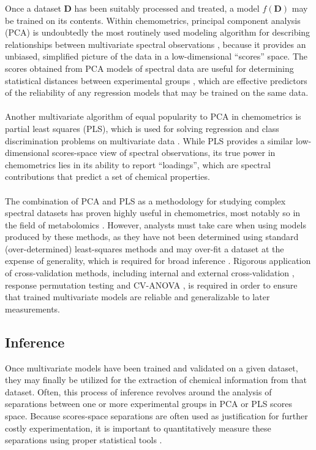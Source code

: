 \begin{doublespace}
Once a dataset $\mathbf{D}$ has been suitably processed and treated, a model
$f(\mathbf{D})$ may be trained on its contents. Within chemometrics, principal
component analysis (PCA) is undoubtedly the most routinely used modeling
algorithm for describing relationships between multivariate spectral
observations \cite{bro:anmeth2014}, because it provides an unbiased,
simplified picture of the data in a low-dimensional ``scores'' space. The
scores obtained from PCA models of spectral data are useful for determining
statistical distances between experimental groups
\cite{demaesschalck:cils2000,worley:abio2013}, which are effective predictors
of the reliability of any regression models that may be trained on the same
data.
\\\\
Another multivariate algorithm of equal popularity to PCA in chemometrics is
partial least squares (PLS), which is used for solving regression and class
discrimination problems on multivariate data \cite{wold1993}. While PLS
provides a similar low-dimensional scores-space view of spectral observations,
its true power in chemometrics lies in its ability to report ``loadings'',
which are spectral contributions that predict a set of chemical properties.
\\\\
The combination of PCA and PLS as a methodology for studying complex spectral
datasets has proven highly useful in chemometrics, most notably so in the
field of metabolomics \cite{lindon:cmr2000}. However, analysts must take care
when using models produced by these methods, as they have not been determined
using standard (over-determined) least-squares methods and may over-fit a
dataset at the expense of generality, which is required for broad inference
\cite{westerhuis:metab2008}. Rigorous application of cross-validation methods,
including internal and external cross-validation
\cite{xu:cils2001,eshghi:cils2014}, response permutation testing
\cite{golland:learn2005} and CV-ANOVA \cite{eriksson:jchemo2008}, is required
in order to ensure that trained multivariate models are reliable and
generalizable to later measurements.
\end{doublespace}

\subsection{Inference}

\begin{doublespace}
Once multivariate models have been trained and validated on a given dataset,
they may finally be utilized for the extraction of chemical information from
that dataset. Often, this process of inference revolves around the analysis of
separations between one or more experimental groups in PCA or PLS scores space.
Because scores-space separations are often used as justification for further
costly experimentation, it is important to quantitatively measure these
separations using proper statistical tools \cite{worley:abio2013}.
\end{doublespace}

